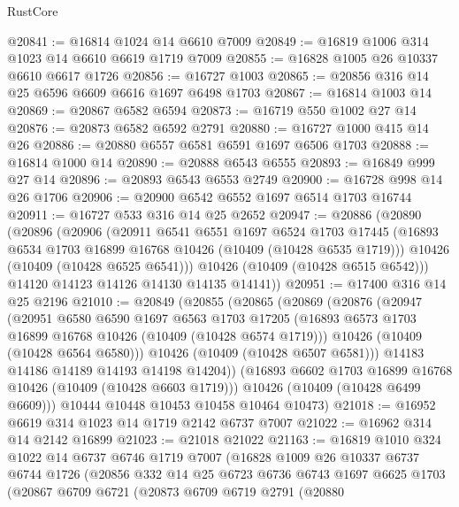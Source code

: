 \begin{lexlean}{RustCore}
\begin{coremodule}
@20841 := @16814 @1024 @14 @6610 @7009
@20849 := @16819 @1006 @314 @1023 @14 @6610 @6619 @1719 @7009
@20855 := @16828 @1005 @26 @10337 @6610 @6617 @1726
@20856 := @16727 @1003
@20865 := @20856 @316 @14 @25 @6596 @6609 @6616 @1697 @6498 @1703
@20867 := @16814 @1003 @14
@20869 := @20867 @6582 @6594
@20873 := @16719 @550 @1002 @27 @14
@20876 := @20873 @6582 @6592 @2791
@20880 := @16727 @1000 @415 @14 @26
@20886 := @20880 @6557 @6581 @6591 @1697 @6506 @1703
@20888 := @16814 @1000 @14
@20890 := @20888 @6543 @6555
@20893 := @16849 @999 @27 @14
@20896 := @20893 @6543 @6553 @2749
@20900 := @16728 @998 @14 @26 @1706
@20906 := @20900 @6542 @6552 @1697 @6514 @1703 @16744
@20911 := @16727 @533 @316 @14 @25 @2652
@20947 := @20886
    (@20890
      (@20896
        (@20906
          (@20911
            @6541
            @6551
            @1697
            @6524
            @1703
            @17445
            (@16893 @6534 @1703 @16899 @16768 @10426 (@10409 (@10428 @6535 @1719)))
            @10426
            (@10409 (@10428 @6525 @6541)))
          @10426
          (@10409 (@10428 @6515 @6542)))
        @14120
        @14123
        @14126
        @14130
        @14135
        @14141))
@20951 := @17400 @316 @14 @25 @2196
@21010 := @20849
    (@20855
      (@20865
        (@20869
          (@20876
            (@20947
              (@20951
                @6580
                @6590
                @1697
                @6563
                @1703
                @17205
                (@16893 @6573 @1703 @16899 @16768 @10426 (@10409 (@10428 @6574 @1719)))
                @10426
                (@10409 (@10428 @6564 @6580)))
              @10426
              (@10409 (@10428 @6507 @6581)))
            @14183
            @14186
            @14189
            @14193
            @14198
            @14204))
        (@16893 @6602 @1703 @16899 @16768 @10426 (@10409 (@10428 @6603 @1719)))
        @10426
        (@10409 (@10428 @6499 @6609)))
      @10444
      @10448
      @10453
      @10458
      @10464
      @10473)
@21018 := @16952 @6619 @314 @1023 @14 @1719 @2142 @6737 @7007
@21022 := @16962 @314 @14 @2142 @16899
@21023 := @21018 @21022
@21163 := @16819
    @1010
    @324
    @1022
    @14
    @6737
    @6746
    @1719
    @7007
    (@16828
      @1009
      @26
      @10337
      @6737
      @6744
      @1726
      (@20856
        @332
        @14
        @25
        @6723
        @6736
        @6743
        @1697
        @6625
        @1703
        (@20867
          @6709
          @6721
          (@20873
            @6709
            @6719
            @2791
            (@20880

\end{coremodule}
\end{lexlean}
